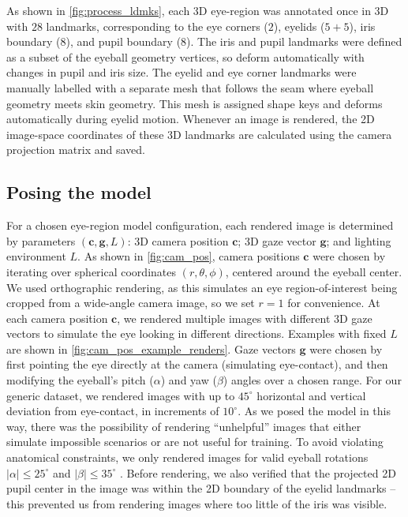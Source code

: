 As shown in \autoref{fig:process_ldmks}, each 3D eye-region was annotated once in 3D with $28$ landmarks, corresponding to the eye corners ($2$), eyelids ($5\!+\!5$), iris boundary ($8$), and pupil boundary ($8$).
The iris and pupil landmarks were defined as a subset of the eyeball geometry vertices, so deform automatically with changes in pupil and iris size.
The eyelid and eye corner landmarks were manually labelled with a separate mesh that follows the seam where eyeball geometry meets skin geometry.
This mesh is assigned shape keys and deforms automatically during eyelid motion.
%
Whenever an image is rendered, the 2D image-space coordinates of these 3D landmarks are calculated using the camera projection matrix and saved.
\subsection{Posing the model}

For a chosen eye-region model configuration, each rendered image is determined by parameters $(\mathbf{c}, \mathbf{g}, L)$: 3D camera position $\mathbf{c}$; 3D gaze vector $\mathbf{g}$; and lighting environment $L$.
As shown in \autoref{fig:cam_pos}, camera positions $\mathbf{c}$ were chosen by iterating over spherical coordinates $(r, \theta, \phi)$, centered around the eyeball center.
We used orthographic rendering, as this simulates an eye region-of-interest being cropped from a wide-angle camera image, so we set $r\!=\!1$ for convenience.
At each camera position $\mathbf{c}$, we rendered multiple images with different 3D gaze vectors to simulate the eye looking in different directions.
Examples with fixed $L$ are shown in \autoref{fig:cam_pos_example_renders}.
Gaze vectors $\mathbf{g}$ were chosen by first pointing the eye directly at the camera (simulating eye-contact), and then modifying the eyeball's pitch ($\alpha$) and yaw ($\beta$) angles over a chosen range.
For our generic \dataset dataset, we rendered images with up to $45^{\circ}$ horizontal and vertical deviation from eye-contact, in increments of $10^{\circ}$.
%
As we posed the model in this way, there was the possibility of rendering ``unhelpful'' images that either simulate impossible scenarios or are not useful for training.
To avoid violating anatomical constraints, we only rendered images for valid eyeball rotations $|\alpha|\!\leq\!25^{\circ}$ and $|\beta|\!\leq\!35^{\circ}$ \cite{MIL-STD-1472G}.
Before rendering, we also verified that the projected 2D pupil center in the image was within the 2D boundary of the eyelid landmarks -- this prevented us from rendering images where too little of the iris was visible.

